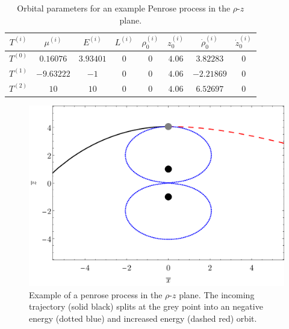\begin{table}[!htbp]
    \centering
    \caption{Orbital parameters for an example Penrose process in the $\rho$-$z$ plane.}
    \begin{tabular}{c|c|c|c|c|c|c|c|}
        \cline{1-8}
        \multicolumn{1}{|c|}{$T^{(i)}$} & $\mu^{(i)}$ & $E^{(i)}$ & $L^{(i)}$ & $\rho_0^{(i)}$ & $z_0^{(i)}$ & $\dot{\rho}_0^{(i)}$ & $\dot{z}_0^{(i)}$ \\ \hline
        \multicolumn{1}{|c|}{$T^{(0)}$} & $0.16076$   & $3.93401$ & $0$       & $0$            & $4.06$      & $3.82283$            & $0$               \\ \hline
        \multicolumn{1}{|c|}{$T^{(1)}$} & $-9.63222$  & $-1$      & $0$       & $0$            & $4.06$      & $-2.21869$           & $0$               \\ \hline
        \multicolumn{1}{|c|}{$T^{(2)}$} & $10$        & $10$      & $0$       & $0$            & $4.06$      & $6.52697$            & $0$               \\ \hline
    \end{tabular}
    \label{ch:penrose_binaries/tab:exemple_orbital_parameters_1}
\end{table}

\begin{figure}[!htbp]
    \centering
    \includegraphics[scale = 0.4]{img/penrose_binaries/mp/penrose_xz.pdf}
    \caption{Example of a penrose process in the $\rho$-$z$ plane. The incoming trajectory (solid black) splits at the grey point into an negative energy (dotted blue) and increased energy (dashed red) orbit.}
    \label{ch:penrose_binaries/fig:penrose_example_1}
\end{figure}

